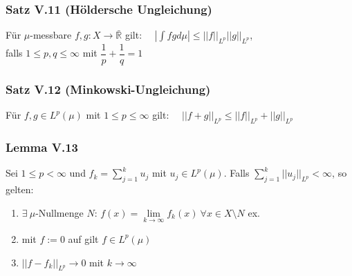 \begin{frame}
\frametitle{Satz V.11 (Höldersche Ungleichung)}
Für $\mu$-messbare $f,g: X \to \bar{\mathbb{R}}$ gilt: \ \ $|\int fg d\mu| \leq ||f||_{L^p} ||g||_{L^p}$,\\
    falls $1 \leq p,q \leq \infty$ mit $\dfrac{1}{p} + \dfrac{1}{q} = 1$
\end{frame}


\begin{frame}
\frametitle{Satz V.12 (Minkowski-Ungleichung)}
Für $f,g \in L^p(\mu)$ mit $1 \leq p \leq \infty$ gilt: \ \ $|| f+g ||_{L^p} \leq ||f||_{L^p} + ||g||_{L^p}$
\end{frame}


\begin{frame}
\frametitle{Lemma V.13}
Sei $1 \leq p < \infty$ und $f_k = \sum\limits_{j=1}^k u_j$ mit $u_j \in L^p(\mu)$. Falls $\sum\limits_{j=1}^k ||u_j||_{L^p} < \infty$, so gelten:
    \begin{enumerate}[label=\roman*)]
      \item $\exists \ \mu$-Nullmenge $N$: $f(x) = \lim\limits_{k \to \infty} f_k(x) \ \forall x \in X \setminus N$ ex.
      \item mit $f := 0$ auf gilt $f \in L^p(\mu)$
      \item $||f - f_k||_{L^p} \to 0$ mit $k \to \infty$
    \end{enumerate}
\end{frame}
